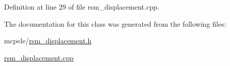\-Definition at line 29 of file rsm\-\_\-displacement.\-cpp.



\-The documentation for this class was generated from the following files\-:\begin{DoxyCompactItemize}
\item 
mcpele/\hyperlink{rsm__displacement_8h}{rsm\-\_\-displacement.\-h}\item 
\hyperlink{rsm__displacement_8cpp}{rsm\-\_\-displacement.\-cpp}\end{DoxyCompactItemize}

